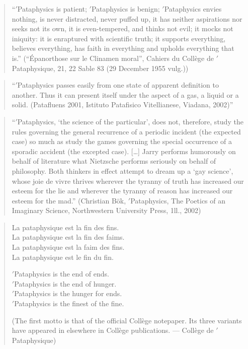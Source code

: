 \begin{quote}
  ``$'$Pataphysics is patient; $'$Pataphysics is benign; $'$Pataphysics envies nothing, is never distracted, never puffed up, it has neither aspirations nor seeks not its own, it is even-tempered, and thinks not evil; it mocks not iniquity: it is enraptured with scientific truth; it supports everything, believes everything, has faith in everything and upholds everything that is.'' (``Épanorthose sur le Clinamen moral'', Cahiers du Collège de $'$Pataphysique, 21, 22 Sable 83 (29 December 1955 vulg.)) \citep{Brotchie2003}
\end{quote}

\begin{quote}
  ``$'$Pataphysics passes easily from one state of apparent definition to another. Thus it can present itself under the aspect of a gas, a liquid or a solid. (Patafluens 2001, Istituto Patafisico Vitellianese, Viadana, 2002)'' \citep{Brotchie2003}
\end{quote}

\begin{quote}
  ``$'$Pataphysics, `the science of the particular', does not, therefore, study the rules governing the general recurrence of a periodic incident (the expected case) so much as study the games governing the special occurrence of a sporadic accident (the excepted case). […] Jarry performs humorously on behalf of literature what Nietzsche performs seriously on behalf of philosophy. Both thinkers in effect attempt to dream up a `gay science', whose joie de vivre thrives wherever the tyranny of truth has increased our esteem for the lie and wherever the tyranny of reason has increased our esteem for the mad.'' (Christian Bök, $'$Pataphysics, The Poetics of an Imaginary Science, Northwestern University Press, 1ll., 2002) \citep{Bok2002}
\end{quote}

\begin{quote}
  \begin{multicols}{2}
  La pataphysique est la fin des fins.\\
  La pataphysique est la fin des faims.\\
  La pataphysique est la faim des fins.\\
  La pataphysique est le fin du fin.
  \par \vfill \columnbreak{}
  \begin{flushright}
  $'$Pataphysics is the end of ends.\\
  $'$Pataphysics is the end of hunger.\\
  $'$Pataphysics is the hunger for ends.\\
  $'$Pataphysics is the finest of the fine.
  \end{flushright}
  \end{multicols}
  (The first motto is that of the official Collège notepaper. Its three variants have appeared in elsewhere in Collège publications. --- Collège de $'$Pataphysique) \citep{Brotchie2003}
\end{quote}

